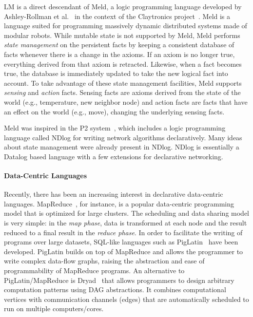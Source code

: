 LM is a direct descendant of Meld, a logic programming language developed by
Ashley-Rollman et
al.~\cite{ashley-rollman-iclp09,ashley-rollman-derosa-iros07wksp} in the context
of the Claytronics project~\cite{goldstein-computer05}. Meld is a language
suited for programming massively dynamic distributed systems made of modular
robots. While mutable state is not supported by Meld, Meld performs \emph{state
management} on the persistent facts by keeping a consistent database of facts
whenever there is a change in the axioms. If an axiom is no longer true,
everything derived from that axiom is retracted. Likewise, when a fact becomes
true, the database is immediately updated to take the new logical fact into
account. To take advantage of these state management facilities, Meld supports
\emph{sensing} and \emph{action} facts. Sensing facts are axioms derived from
the state of the world (e.g., temperature, new neighbor node) and action facts
are facts that have an effect on the world (e.g., move), changing the underlying
sensing facts.

Meld was inspired in the P2 system~\cite{Loo-condie-garofalakis-p2}, which
includes a logic programming language called NDlog for writing network
algorithms declaratively. Many ideas about state management were already present
in NDlog.  NDlog is essentially a Datalog based language with a few extensions
for declarative networking.

\paragraph{Data-Centric Languages}

Recently, there has been an increasing interest in declarative data-centric
languages. MapReduce~\cite{Dean:2008:MSD:1327452.1327492}, for instance, is a
popular data-centric programming model that is optimized for large clusters. The
scheduling and data sharing model is very simple: in the \emph{map phase}, data
is transformed at each node and the result reduced to a final result in the
\emph{reduce phase}. In order to facilitate the writing of programs over large
datasets, SQL-like languages such as
PigLatin~\cite{Olston:2008:PLN:1376616.1376726} have been developed. PigLatin
builds on top of MapReduce and allows the programmer to write complex data-flow
graphs, raising the abstraction and ease of programmability of MapReduce
programs. An alternative to PigLatin/MapReduce is
Dryad~\cite{Isard:2007:DDD:1272996.1273005} that allows programmers to design
arbitrary computation patterns using DAG abstractions. It combines computational
vertices with communication channels (edges) that are automatically scheduled to
run on multiple computers/cores.

